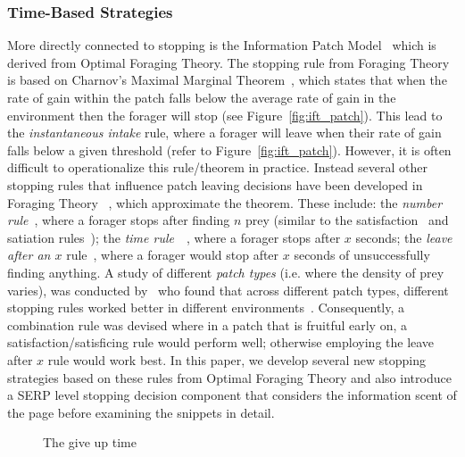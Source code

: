 \subsubsection{Time-Based Strategies}
More directly connected to stopping is the Information Patch Model~\cite{pirolli1999ift} which is derived from Optimal Foraging Theory. The stopping rule from Foraging Theory is based on Charnov's Maximal Marginal Theorem~\cite{charnov1976mvt}, which states that when the rate of gain within the patch falls below the average rate of gain in the environment then the forager will stop (see Figure~\ref{fig:ift_patch}). This lead to the \emph{instantaneous intake} rule, where a forager will leave when their rate of gain falls below a given threshold (refer to Figure~\ref{fig:ift_patch}). However, it is often difficult to operationalize this rule/theorem in practice. Instead several other stopping rules that influence patch leaving decisions have been developed in Foraging Theory ~\citet{stephens1986foraging_theory}, which approximate the theorem. These  include: the \emph{number rule}~\cite{gibbs1958number_rule}, where a forager stops after finding $n$ prey (similar to the satisfaction~\cite{cooper1973retrieval_effectiveness} and satiation rules~\cite{kraft1979stopping_rules}); the \emph{time rule}~\cite{krebs1973time_rule}~\cite{charles1972behaviour}, where a forager stops after $x$ seconds; the \emph{leave after an $x$} rule~\cite{krebs1974leave_after_rule}, where a forager would stop after $x$ seconds of unsuccessfully finding anything. A study of different \emph{patch types} (i.e. where the density of prey varies), was conducted by~\citet{mcnair1982gut_mvt} who found that across different patch types, different stopping rules worked better in different environments~\cite{mcnair1982gut_mvt, green1984oft_stopping, iwasa1981prey_distribution}. Consequently, a combination rule was devised where in a patch that is fruitful early on, a satisfaction/satisficing rule would perform well; otherwise employing the leave after $x$ rule would work best. In this paper, we develop several new stopping strategies based on these rules from Optimal Foraging Theory and also introduce a SERP level stopping decision component that considers the information scent of the page before examining the snippets in detail.

\begin{figure}[t!]
    \centering
    \caption[Give Up Time]{The give up time}
    \label{fig:gut}
\end{figure}

